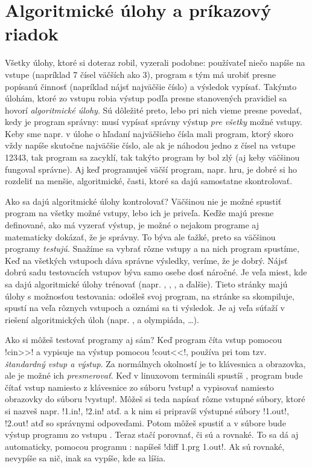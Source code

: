 \chapter{Algoritmické úlohy a príkazový riadok}

Všetky úlohy, ktoré si doteraz robil, vyzerali podobne: používateľ niečo napíše na vstupe
(napríklad 7 čísel väčších ako 3),
program s tým má urobiť presne popísanú činnosť (napríklad nájsť najväčšie číslo) a výsledok 
vypísať. Takýmto úlohám, ktoré zo vstupu robia výstup podľa presne stanovených pravidiel
sa hovorí {\em algoritmické úlohy}. Sú dôležité preto, lebo pri nich vieme presne
povedať, kedy je program správny: musí vypísať správny výstup {\em pre všetky} možné vstupy.
Keby sme napr. v úlohe o hľadaní najväčšieho čísla mali program, ktorý skoro vždy
napíše skutočne najväčšie číslo, ale ak je náhodou jedno z čísel na vstupe 12343, 
tak program sa zacyklí,
tak takýto program by bol zlý (aj keby väčšinou fungoval správne).
Aj keď programuješ väčší program, napr. hru, je dobré si ho rozdeliť na menšie, algoritmické,
časti, ktoré sa dajú samostatne skontrolovať. 

Ako sa dajú algoritmické úlohy kontrolovať? Väčšinou nie je možné spustiť program
na všetky možné vstupy, lebo ich je priveľa. Keďže majú presne definované, ako má vyzerať
výstup, je možné o nejakom programe aj matematicky dokázať, že je správny. To býva ale
ťažké, preto sa väčšinou programy {\em testujú}. Snažíme sa vybrať rôzne vstupy a na nich
program spustíme, Keď na všetkých vstupoch dáva správne výsledky, veríme, že je dobrý.
Nájsť dobrú sadu testovacích vstupov býva samo osebe dosť náročné. Je veľa miest,
kde sa dajú algoritmické úlohy trénovať (napr. 
, ,
, 
a ďalšie). Tieto stránky majú úlohy s možnosťou testovania: odošleš svoj program, na
stránke sa skompiluje, spustí na veľa rôznych vstupoch a oznámi sa ti výsledok. Je aj
veľa súťaží v riešení algoritmických úloh (napr. 
,  a 
 olympiáda, \ldots).

Ako si môžeš testovať programy aj sám? Keď program číta vstup pomocou \prg!cin>>! a 
vypisuje na výstup pomocou \prg!cout<<!, používa pri tom tzv. {\em štandardný vstup a výstup}.
Za normálnych okolností je to klávesnica a obrazovka, ale je možné ich 
{\em presmerovať}. Keď v linuxovom termináli spustíš 
, program bude čítať vstup namiesto z klávesnice 
zo súboru \prg!vstup! a vypisovať namiesto obrazovky do súboru \prg!vystup!. Môžeš
si teda napísať rôzne vstupné súbory, ktoré si nazveš napr. \prg!1.in!, \prg!2.in!
atď. a k nim si pripravíš výstupné súbory \prg!1.out!, \prg!2.out! atď so správnymi 
odpoveďami.
Potom môžeš spustiť  a v súbore  bude výstup 
programu zo vstupu . Teraz stačí porovnať, či sú  a 
rovnaké. To sa dá aj automaticky, pomocou programu : napíšeš 
\prg!diff 1.prg 1.out!. 
Ak sú rovnaké, 
nevypíše sa nič, inak sa vypíše, kde sa líšia.

